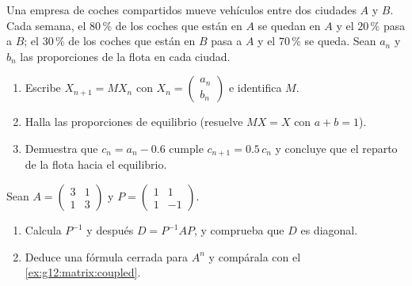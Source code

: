 \begin{exercise}[$\star\star$]\label{exo:g12:matrix:7}
Una empresa de coches compartidos mueve vehículos entre dos ciudades $A$ y
$B$. Cada semana, el $80\,\%$ de los coches que están en $A$ se quedan en
$A$ y el $20\,\%$ pasa a $B$; el $30\,\%$ de los coches que están en $B$
pasa a $A$ y el $70\,\%$ se queda. Sean $a_n$ y $b_n$ las proporciones de
la flota en cada ciudad.
\begin{omfigure}
\end{omfigure}
\begin{enumerate}
  \item Escribe $X_{n+1} = MX_n$ con
        $X_n = \begin{pmatrix} a_n\\ b_n\end{pmatrix}$ e identifica $M$.
  \item Halla las proporciones de equilibrio (resuelve $MX = X$ con
        $a + b = 1$).
  \item Demuestra que $c_n = a_n - 0.6$ cumple $c_{n+1} = 0.5\,c_n$ y
        concluye que el reparto de la flota  hacia el equilibrio.
\end{enumerate}
\end{exercise}

\begin{exercise}[$\star\star\star$]\label{exo:g12:matrix:8}
Sean $A = \begin{pmatrix} 3 & 1\\ 1 & 3 \end{pmatrix}$ y
$P = \begin{pmatrix} 1 & 1\\ 1 & -1 \end{pmatrix}$.
\begin{enumerate}
  \item Calcula $P^{-1}$ y después $D = P^{-1}AP$, y comprueba que $D$ es
        diagonal.
  \item Deduce una fórmula cerrada para $A^n$ y compárala con el
        \cref{ex:g12:matrix:coupled}.
\end{enumerate}
\end{exercise}

